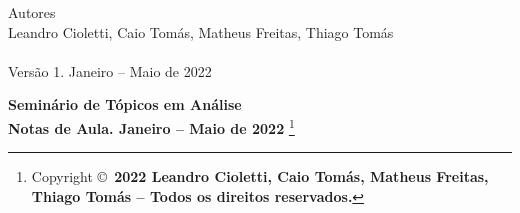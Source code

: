 \documentclass[12pt,oneside]{book}
\begin{document}
\frontmatter 



\noindent
{\huge Autores}
\\[0.3cm]
Leandro Cioletti, Caio Tomás, Matheus Freitas, Thiago Tomás
\\
\bigskip
\\[-0.1cm]
Versão 1.  Janeiro -- Maio de 2022
\\[0.3cm]
\noindent



\vfill
{\fontsize{14pt}{14pt}\selectfont
	\noindent
   \textbf{Seminário de Tópicos em Análise \\ Notas de Aula.  Janeiro -- Maio de 2022}
   \footnote{
   		Copyright \copyright\ 
   		\textbf{2022 Leandro Cioletti, Caio Tomás, Matheus Freitas, Thiago Tomás -- Todos os direitos reservados.}
   	}
 }



\tableofcontents
{}



 
\mainmatter 
\end{document}
